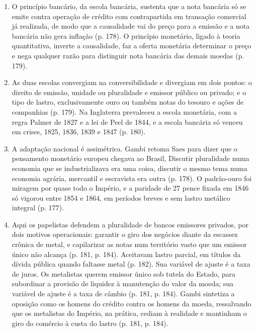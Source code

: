 \begin{enumerate}[leftmargin=*,nosep]
\item O princípio bancário, da escola bancária, sustenta que a nota bancária só
se emite contra operação de crédito com contrapartida em transação comercial já
realizada, de modo que a causalidade vai do preço para a emissão e a nota
bancária não gera inflação (p. 178). O princípio monetário, ligado à teoria
quantitativa, inverte a causalidade, faz a oferta monetária determinar o preço
e nega qualquer razão para distinguir nota bancária das demais moedas (p. 179).

\item As duas escolas convergiam na conversibilidade e divergiam em dois
pontos: o direito de emissão, unidade ou pluralidade e emissor público ou
privado; e o tipo de lastro, exclusivamente ouro ou também notas do tesouro e
ações de companhias (p. 179). Na Inglaterra prevaleceu a escola monetária, com
a regra Palmer de 1827 e a lei de Peel de 1844, e a escola bancária só venceu
em crises, 1825, 1836, 1839 e 1847 (p. 180).

\item A adaptação nacional é assimétrica. Gambi retoma Saes para dizer que o
pensamento monetário europeu chegava ao Brasil, 
Discutir pluralidade numa economia que se industrializava era uma coisa,
discutir o mesmo tema numa economia agrária, mercantil e escravista era outra
(p. 178). O padrão-ouro foi miragem por quase todo o Império, e a paridade de 27
pence fixada em 1846 só vigorou entre 1854 e 1864, em períodos breves e sem
lastro metálico integral (p. 177).

\item Aqui os papelistas defendem a pluralidade de bancos emissores privados,
por dois motivos operacionais: garantir o giro dos negócios diante da escassez
crônica de metal, e capilarizar as notas num território vasto que um emissor
único não alcança (p. 181, p. 184). Aceitavam lastro parcial, em títulos da
dívida pública quando faltasse metal (p. 182). Sua variável de ajuste é a taxa
de juros. Os metalistas querem emissor único sob tutela do Estado, para
subordinar a provisão de liquidez à manutenção do valor da moeda; sua variável
de ajuste é a taxa de câmbio (p. 181, p. 184). Gambi sintetiza a oposição como
os homens do crédito contra os homens da moeda, ressalvando que os metalistas
do Império, na prática, cediam à realidade e mantinham o giro do comércio à
custa do lastro (p. 181, p. 184).


\end{enumerate}
